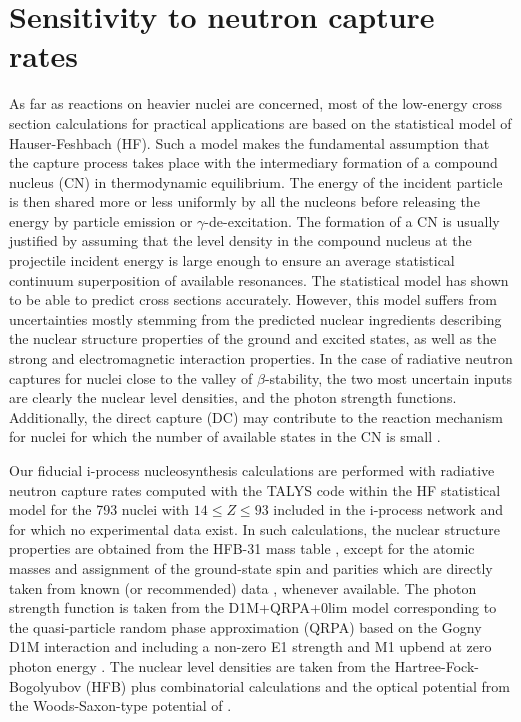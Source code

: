 \documentclass{aa}
\begin{document}
\section{Sensitivity to neutron capture rates}
\label{sect_ng}

As far as reactions on heavier nuclei are concerned, most of the low-energy cross section calculations for practical applications are based on the
statistical model of Hauser-Feshbach (HF). Such a
model makes the fundamental assumption that the capture process takes place
with the intermediary formation of a compound nucleus (CN) in thermodynamic
equilibrium. The energy of the incident particle is then shared more or
less uniformly by all the nucleons before releasing the energy by
particle emission or $\gamma$-de-excitation. The formation of a CN
 is usually justified by assuming that the level density in the
compound nucleus at the projectile incident energy is large enough to
ensure an average statistical continuum superposition of available
resonances. The statistical model has shown to be able to
predict cross sections accurately. However, this model suffers from
uncertainties mostly stemming from the predicted nuclear
ingredients describing the nuclear structure properties of the ground
and excited states, as well as the strong and electromagnetic interaction
properties. In the case of radiative neutron captures for nuclei close to the valley of $\beta$-stability,
the two most uncertain inputs are clearly the nuclear level densities, and the photon strength functions.
Additionally, the direct capture (DC) may contribute to the reaction mechanism
for nuclei for which the number of available states in the CN is small \citep{Xu14}.

Our fiducial i-process nucleosynthesis calculations are performed with radiative neutron capture
rates computed with the {\sf TALYS} code within the HF statistical model for the 793 nuclei with $14 \le Z \le 93$ included in the i-process network and for which no experimental data exist.
In such calculations, the nuclear structure properties are obtained from the HFB-31 mass table \citep{Goriely16a},
except for the atomic masses and assignment of the ground-state spin and parities which are directly taken from known (or recommended) data \citep{Wang17,Audi17a}, whenever available.
The photon strength function is taken from the D1M+QRPA+0lim model corresponding to the quasi-particle random phase approximation (QRPA) based on
the Gogny D1M  interaction and including a non-zero E1 strength and M1 upbend at zero photon energy \citep{Goriely19}. The nuclear level densities
are taken from the Hartree-Fock-Bogolyubov (HFB) plus combinatorial calculations \citep{Goriely08b} and the optical potential from the
Woods-Saxon-type potential of \cite{Koning03}.
\end{document}
